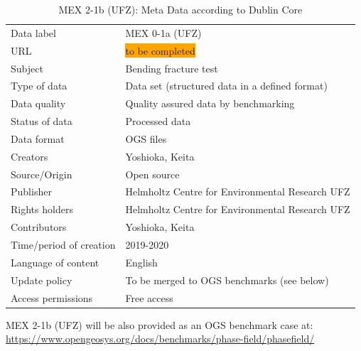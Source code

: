 \begin{table}[!ht]
\caption{MEX 2-1b (UFZ): Meta Data according to Dublin Core}
\label{tab:dms-mex2-1a}
\small
\begin{tabular}{R{3.5cm}|L{7.5cm}}
\hline
%
Data label & MEX 0-1a (UFZ) \\
URL & \colorbox{orange}{to be completed} \\ 
Subject  & Bending fracture test \\
Type of data  & Data set (structured data in a defined format) \\
Data quality  & Quality assured data by benchmarking \\
Status of data  & Processed data \\
Data format  & OGS files \\
Creators  & Yoshioka, Keita  \\
Source/Origin & Open source \\
Publisher  & Helmholtz Centre for Environmental Research UFZ \\
Rights holders & Helmholtz Centre for Environmental Research UFZ \\
Contributors & Yoshioka, Keita \\
Time/period of creation & 2019-2020 \\
Language of content & English \\
Update policy & To be merged to OGS benchmarks (see below) \\
Access permissions & Free access \\
%
\hline
\end{tabular}
\end{table}

MEX 2-1b (UFZ) will be also provided as an OGS benchmark case at:\\
\small
\url{https://www.opengeosys.org/docs/benchmarks/phase-field/phasefield/}
\normalsize